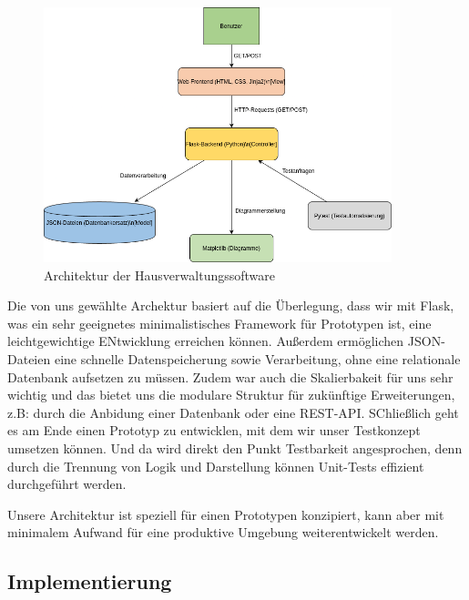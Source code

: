\begin{figure}[H] \centering \includegraphics[width=0.9\textwidth]{src/abbildungen/architektur.png} %
    \caption{Architektur der Hausverwaltungssoftware} \label{fig:architektur} 
\end{figure}

Die von uns gewählte Archektur basiert auf die Überlegung, dass wir mit Flask, was ein sehr geeignetes minimalistisches Framework für Prototypen ist, eine leichtgewichtige ENtwicklung erreichen können.
Außerdem ermöglichen JSON-Dateien eine schnelle Datenspeicherung sowie Verarbeitung, ohne eine relationale Datenbank aufsetzen zu müssen. Zudem war auch die Skalierbakeit für uns sehr wichtig und das bietet uns die modulare Struktur für zukünftige Erweiterungen, z.B: durch die Anbidung einer Datenbank oder eine REST-API.
SChließlich geht es am Ende einen Prototyp zu entwicklen, mit dem wir unser Testkonzept umsetzen können. Und da wird direkt den Punkt Testbarkeit angesprochen, denn durch die Trennung von Logik und Darstellung können Unit-Tests effizient durchgeführt werden.\par

Unsere Architektur ist speziell für einen Prototypen konzipiert, kann aber mit minimalem Aufwand für eine produktive Umgebung weiterentwickelt werden.\par

\subsection{Implementierung}

